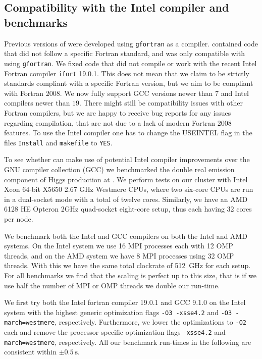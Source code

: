 \subsection{Compatibility with the Intel compiler and benchmarks}

Previous versions of \MCFM{} were developed using \texttt{gfortran} as a compiler. \MCFM{} contained code that did not 
follow 
a specific Fortran standard, and was only compatible with using \texttt{gfortran}. We fixed code that did not compile 
or work with the recent Intel Fortran compiler \texttt{ifort} 19.0.1. This does not mean that we claim to be strictly 
standards 
compliant with a specific Fortran version, but we aim to be compliant with Fortran 2008. We now fully support GCC 
versions newer than $7$ and Intel compilers newer than $19$. There might still be compatibility issues with other 
Fortran compilers, but we are happy to receive bug reports for any issues regarding compilation, that are not due to a 
lack of modern Fortran 2008 features. To use the Intel compiler one has to change the USEINTEL flag in the files 
\texttt{Install} and \texttt{makefile}
to \texttt{YES}.

To see whether \MCFM{} can make use of potential Intel compiler improvements over the GNU compiler 
collection (GCC) we benchmarked 
the double
real emission component of Higgs production at \NNLO{}. We perform tests on our cluster with
Intel Xeon 64-bit X5650 2.67 GHz Westmere CPUs, where two six-core CPUs are run in a dual-socket mode with a total
of twelve cores. Similarly, we have an AMD 6128 HE Opteron 2GHz quad-socket eight-core setup, thus each having
32 cores per node.

We benchmark both the Intel and GCC compilers on both the Intel and AMD systems. On the Intel system we use 16 MPI 
processes each with 12 OMP threads, 
and on the AMD system we have 8 MPI processes using 32 OMP threads. With this we have the same total
clockrate of \SI{512}{GHz} for each setup. For all benchmarks we find that the scaling is perfect up to this size, that 
is if we use half the number of MPI or OMP threads we double our run-time.

We first try both the Intel fortran compiler 19.0.1 and GCC 9.1.0 on the Intel system with the highest generic
optimization flags \texttt{-O3 -xsse4.2} and \texttt{-O3 -march=westmere}, respectively. Furthermore,
we lower the optimizations to \texttt{-O2} each and remove the processor specific optimization flags
\texttt{-xsse4.2} and \texttt{-march=westmere}, respectively. All our benchmark run-times in the following are 
consistent
within $\pm \SI{0.5}{\s}$.

